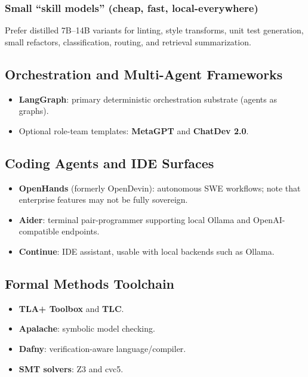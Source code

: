 \documentclass[11pt]{article}
\begin{document}
\subsubsection{Small ``skill models'' (cheap, fast, local-everywhere)}
Prefer distilled 7B--14B variants for linting, style transforms, unit test generation, small refactors,
classification, routing, and retrieval summarization.

\subsection{Orchestration and Multi-Agent Frameworks}

\begin{itemize}
  \item \textbf{LangGraph}: primary deterministic orchestration substrate (agents as graphs).
  \item Optional role-team templates: \textbf{MetaGPT} and \textbf{ChatDev 2.0}.
\end{itemize}

\subsection{Coding Agents and IDE Surfaces}

\begin{itemize}
  \item \textbf{OpenHands} (formerly OpenDevin): autonomous SWE workflows; note that enterprise features may not be fully sovereign.
  \item \textbf{Aider}: terminal pair-programmer supporting local Ollama and OpenAI-compatible endpoints.
  \item \textbf{Continue}: IDE assistant, usable with local backends such as Ollama.
\end{itemize}

\subsection{Formal Methods Toolchain}

\begin{itemize}
  \item \textbf{TLA+ Toolbox} and \textbf{TLC}.
  \item \textbf{Apalache}: symbolic model checking.
  \item \textbf{Dafny}: verification-aware language/compiler.
  \item \textbf{SMT solvers}: Z3 and cvc5.
\end{itemize}
\end{document}
